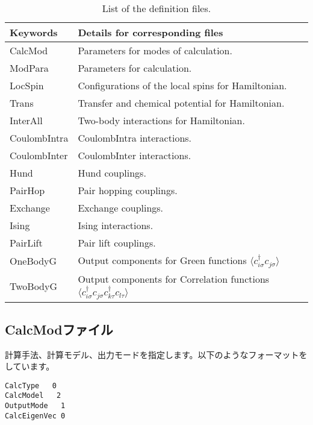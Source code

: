  \begin{table*}[h!]
\begin{center}
  \begin{tabular}{ll|} \hline
           Keywords     & Details for corresponding files       \\   \hline\hline
           CalcMod      &   Parameters for modes of calculation.  \\  \hline  
           ModPara       &  Parameters for calculation.        \\ \hline   
           LocSpin         &  Configurations of the local spins for Hamiltonian.         \\ 
           Trans       &   Transfer and chemical potential for Hamiltonian.  \\
           InterAll  &   Two-body interactions for Hamiltonian. \\  
           CoulombIntra  &   CoulombIntra interactions. \\  
           CoulombInter  &   CoulombInter  interactions. \\  
           Hund  &   Hund couplings. \\  
           PairHop  &  Pair hopping couplings. \\  
           Exchange  &  Exchange couplings. \\  
           Ising  &  Ising interactions. \\  
           PairLift  &   Pair lift couplings. \\  
           OneBodyG         &   Output components for Green functions $\langle c_{i\sigma}^{\dagger}c_{j\sigma}\rangle$           \\   
           TwoBodyG &   Output components for Correlation functions $\langle c_{i\sigma}^{\dagger}c_{j\sigma}c_{k\tau}^{\dagger}c_{l\tau}\rangle$  \\   \hline
  \end{tabular}
\end{center}
\caption{List of the definition files.}
\label{Table:Defs}
\end{table*}%

\newpage
\subsection{CalcModファイル}
\label{Subsec:calcmod}
計算手法、計算モデル、出力モードを指定します。以下のようなフォーマットをしています。\\
\begin{minipage}{10cm}
\begin{screen}
\begin{verbatim}
CalcType   0
CalcModel   2
OutputMode   1
CalcEigenVec 0
\end{verbatim}
\end{screen}
\end{minipage}
\\
